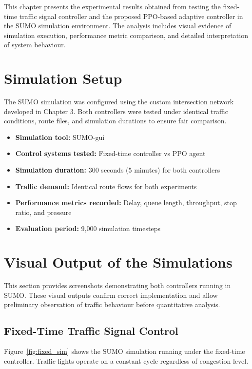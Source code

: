 \documentclass[11pt, a4paper]{report}
\begin{document}
This chapter presents the experimental results obtained from testing the fixed-time traffic signal controller and the proposed PPO-based adaptive controller in the SUMO simulation environment. The analysis includes visual evidence of simulation execution, performance metric comparison, and detailed interpretation of system behaviour.

\section{Simulation Setup}

The SUMO simulation was configured using the custom intersection network developed in Chapter 3. Both controllers were tested under identical traffic conditions, route files, and simulation durations to ensure fair comparison.

\begin{itemize}
    \item \textbf{Simulation tool:} SUMO-gui
    \item \textbf{Control systems tested:} Fixed-time controller vs PPO agent
    \item \textbf{Simulation duration:} 300 seconds (5 minutes) for both controllers
    \item \textbf{Traffic demand:} Identical route flows for both experiments
    \item \textbf{Performance metrics recorded:} Delay, queue length, throughput, stop ratio, and pressure
    \item \textbf{Evaluation period:} 9,000 simulation timesteps
\end{itemize}

\section{Visual Output of the Simulations}

This section provides screenshots demonstrating both controllers running in SUMO. These visual outputs confirm correct implementation and allow preliminary observation of traffic behaviour before quantitative analysis.

\subsection{Fixed-Time Traffic Signal Control}

Figure~\ref{fig:fixed_sim} shows the SUMO simulation running under the fixed-time controller. Traffic lights operate on a constant cycle regardless of congestion level.
\end{document}

